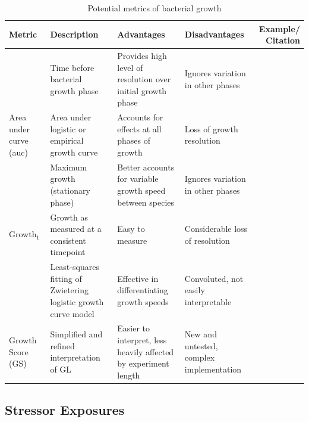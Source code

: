 \documentclass[10pt]{article}
\begin{document}
\begin{table}[ht]
\centering
\scriptsize
\caption{Potential metrics of bacterial growth}
\renewcommand{\arraystretch}{1.8}
\begin{tabular}{P M L L N}
\toprule 
\textbf{Metric} & \textbf{Description} & \textbf{Advantages} & \textbf{Disadvantages} & \textbf{Example/ Citation} \\
\midrule
{} & Time before bacterial growth phase & Provides high level of resolution over initial growth phase & Ignores variation in other phases & \cite{Monod1949} \\
{Area under curve (auc)} & Area under logistic or empirical growth curve & Accounts for effects at all phases of growth & Loss of growth resolution & \cite{Firsov2001} \\
 & Maximum growth (stationary phase) & Better accounts for variable growth speed between species & Ignores variation in other phases & \cite{Chapman2018} \\
{Growth\textsubscript{t}} & Growth as measured at a consistent timepoint & Easy to measure & Considerable loss of resolution & \cite{Hall2014} \\
 & Least-squares fitting of Zwietering logistic growth curve model & Effective in differentiating growth speeds &  Convoluted, not easily interpretable & \cite{Cuevas2017,Cuevas2018}\\
{Growth Score (GS)} & Simplified and refined interpretation of GL & Easier to interpret, less heavily affected by experiment length & New and untested, complex implementation & \cite{Cuevas2018}\\
\bottomrule
\end{tabular}
\label{tab:metrics}
\end{table}

\subsection{Stressor Exposures}
\label{S:2:5}
\end{document}

